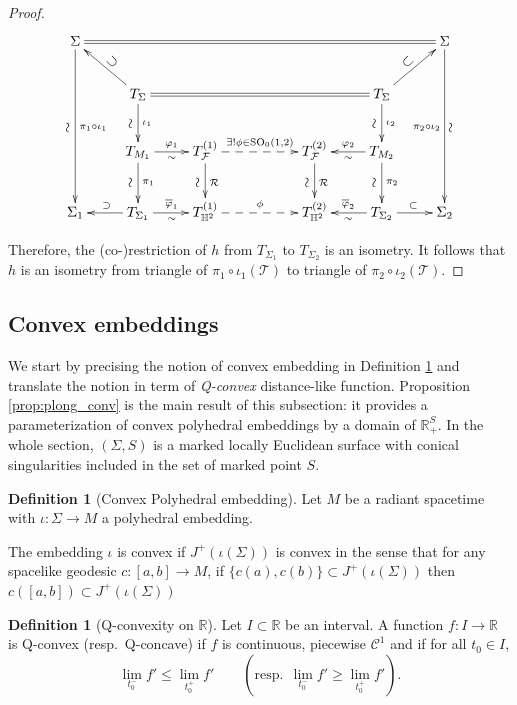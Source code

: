 \documentclass[a4paper,12pt]{article}
\def\H{\mathbb{H}}
\def\GGL{\SO_0(1,2)}
\def\TT{\mathcal T}
\def\R{\mathbb{R}}
\def\SO{\mathrm{SO}}
\def\RR{\mathbb{R}}
\def\SO{\mathrm{SO}}
\def\R{\mathcal R}
\def\Future{\mathcal F}
\theoremstyle{definition}
\newtheorem{defi}[lem]{Definition}	%
\begin{document}
\begin{proof}
						
						
						$$
						\xymatrix{
						\Sigma\ar[ddd]^{\pi_1\circ\iota_1}_{\rotatebox{90}{$\sim$}}\ar@{=}[rrrrrr]&&&&&&\Sigma\ar[ddd]_{\pi_2\circ \iota_2}^{\rotatebox{90}{$\sim$}}
						\\&T_{\Sigma}\ar[ul]_*-{\rotatebox{-45}{$\supset$}} \ar[d]_{\rotatebox{90}{$\sim$}}^{\iota_1}\ar@{=}[rrrr]&&&&T_{\Sigma}\ar[d]_{\rotatebox{90}{$\sim$}}^{\iota_2}\ar[ur]^*-{\rotatebox{45}{$\subset$}}&
						\\& T_{M_1}\ar[d]_{\rotatebox{90}{$\sim$}}^{\pi_1}\ar[r]_{\sim}^{\varphi_1}& T_{\Future}^{(1)} \ar[d]_{\rotatebox{90}{$\sim$}}^{\R} \ar@{-->}[rr]^{\exists!\phi \in \GGL}
						&&T_{\Future}^{(2)} \ar[d]_{\rotatebox{90}{$\sim$}}^{\R}&T_{M_2}\ar[d]_{\rotatebox{90}{$\sim$}}^{\pi_2}\ar[l]^{\sim}_{\varphi_2}&
						\\ \Sigma_1&\ar[l]_{\supset}T_{\Sigma_1} \ar[r]_{\sim}^{\overline\varphi_1}& T^{(1)}_{\H^2} \ar@{-->}[rr]^\phi
						&& T^{(2)}_{\H^2}&T_{\Sigma_2} \ar[l]^{\sim}_{\overline\varphi_2} \ar[r]^\subset& \Sigma_2
						}
						$$
						
						Therefore, the (co-)restriction of $h$ from $T_{\Sigma_1}$ to $T_{\Sigma_2}$ is an isometry. It follows that $h$ is an isometry from triangle of $\pi_1\circ \iota_1(\TT)$ to triangle of $\pi_2\circ\iota_2(\TT)$.\end{proof}


				\subsection{Convex embeddings}

					We start by precising the notion of convex embedding in Definition \ref{defi:plong_conv} and translate the notion in term of {\it Q-convex} distance-like function.
					Proposition \ref{prop:plong_conv} is the main result of this subsection: it provides 
					a parameterization of convex polyhedral embeddings by a domain of $\RR_+^S$.
					In the whole section, $(\Sigma, S)$ is a marked locally Euclidean surface with conical singularities included in the set of marked point $S$.

					\begin{defi}[Convex Polyhedral embedding] \label{defi:plong_conv}
						Let $M$ be a radiant spacetime with $\iota:\Sigma\rightarrow M$ a polyhedral embedding.

						The embedding $\iota$ is convex if $J^+(\iota(\Sigma))$ is convex in the sense that for any spacelike geodesic $c:[a,b]\rightarrow M$, if $\{c(a),c(b)\}\subset J^+(\iota(\Sigma))$ then 
						$c([a,b]) \subset J^+(\iota(\Sigma))$

					\end{defi}
					\begin{defi}[Q-convexity on $\RR$] Let $I\subset \RR$ be an interval.
						A function $f: I \rightarrow \RR$ is Q-convex (resp.\ Q-concave)
						if $f$ is continuous, piecewise $\mathscr{C}^1$ and if for all $t_0\in I$,
						$$\lim_{t_0^-}f' \leq \lim_{t_0^+} f'\quad\quad \left( \mathrm{resp.}~~ \lim_{t_0^-}f' \geq \lim_{t_0^+} f'\right).$$
					\end{defi}
\end{document}
